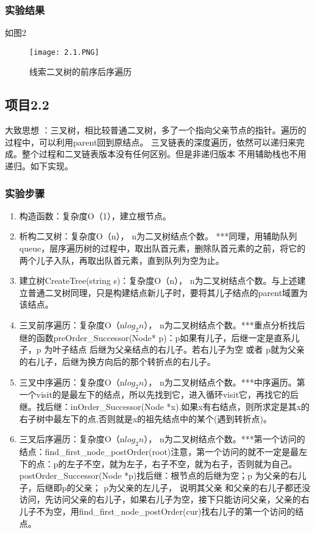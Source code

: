 \subsubsection{实验结果}如图2
	\begin{figure}[!bthp]
	\centering
    
		\texttt{[image: 2.1.PNG]}
        \caption{线索二叉树的前序后序遍历}
      \end{figure}


\subsection{项目2.2}
大致思想 ：三叉树，相比较普通二叉树，多了一个指向父亲节点的指针。遍历的过程中，可以利用parent回到原结点。
三叉链表的深度遍历，依然可以递归来完成。整个过程和二叉链表版本没有任何区别。但是非递归版本   不用辅助栈也不用递归。如下实现。
\subsubsection{实验步骤}
\begin{enumerate}
\item 构造函数：复杂度O（1），建立根节点。
\item 析构二叉树：复杂度O（n）， n为二叉树结点个数。      ***同理，用辅助队列queue，层序遍历树的过程中，取出队首元素，删除队首元素的之前，将它的两个儿子入队，再取出队首元素，直到队列为空为止。
\item 建立树CreateTree(string s)：复杂度O（n）， n为二叉树结点个数。与上述建立普通二叉树同理，只是构建结点新儿子时，要将其儿子结点的parent域置为该结点。
\item 三叉前序遍历：复杂度O（n$log_2 n$）， n为二叉树结点个数。***重点分析找后继的函数preOrder\_Successor(Node* p)：p如果有儿子，后继一定是直系儿子，p 为叶子结点 后继为父亲结点的右儿子。若右儿子为空 或者 p就为父亲的右儿子，后继为换方向后的那个转折点的右儿子。
\item 三叉中序遍历：复杂度O（n$log_2 n$）， n为二叉树结点个数。***中序遍历。第一个visit的是最左下的结点，所以先找到它，进入循环visit它，再找它的后继。找后继：inOrder\_Successor(Node *x).如果x有右结点，则所求定是其x的右子树中最左下的点,否则就是x的祖先结点中的某个(遇到转折点)。
\item 三叉后序遍历：复杂度O（n$log_2 n$）， n为二叉树结点个数。***第一个访问的结点：find\_first\_node\_postOrder(root)注意，第一个访问的就不一定是最左下的点：p的左子不空，就为左子，右子不空，就为右子，否则就为自己。postOrder\_Successor(Node *p)找后继：根节点的后继为空；p 为父亲的右儿子，后继即p的父亲； p为父亲的左儿子， 说明其父亲 和父亲的右儿子都还没访问，先访问父亲的右儿子，如果右儿子为空，接下只能访问父亲，父亲的右儿子不为空，用find\_first\_node\_postOrder(cur)找右儿子的第一个访问的结点。
\end{enumerate}

